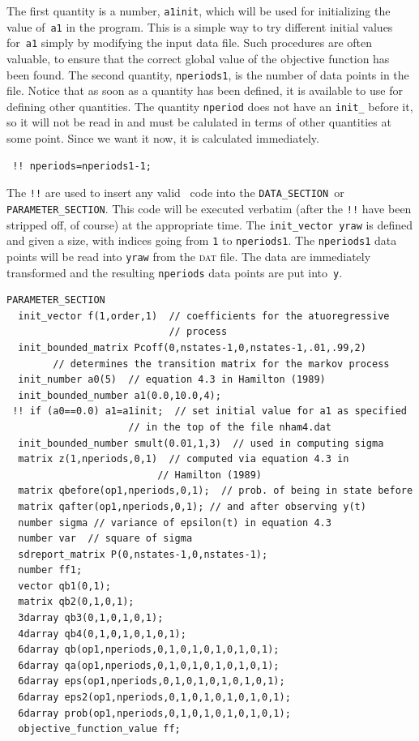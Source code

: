 \documentclass{admbmanual}
\newcommand\DS{\texttt{DATA\_SECTION}}
\newcommand\PS{\texttt{PARAMETER\_SECTION}}
\begin{document}
The first quantity is a number, \texttt{a1init}, which will be used for initializing the
value of~\texttt{a1} in the program. This is a simple way to try 
different initial values for~\texttt{a1} simply by modifying the input data file.
Such procedures are often valuable, to ensure that the correct global
value of the objective function has been found.
The  second quantity, \texttt{nperiods1}, is the number of data points in the
file. Notice that as soon as a quantity has been defined, it is available to use for
defining other quantities. The quantity \texttt{nperiod} does not have an
\texttt{init\_} before it, so it will not be read in and must be calulated
in terms of other quantities at some point. Since we want it now, it is 
calculated immediately.
\begin{lstlisting}
 !! nperiods=nperiods1-1;
\end{lstlisting}
The \texttt{!!} are used to insert any valid \cplus\ code into the \DS\
or \PS. %
This code will be executed verbatim (after the \texttt{!!} have been stripped off, of
course) at the appropriate time.
The \texttt{init\_vector yraw} is defined and given a size, with indices going from
\texttt{1} to \texttt{nperiods1}. The \texttt{nperiods1} data points will be read into
\texttt{yraw} from the \textsc{dat} file. 
The data are immediately transformed and the resulting
\texttt{nperiods} data points are put into~\texttt{y}.
\begin{lstlisting}
PARAMETER_SECTION
  init_vector f(1,order,1)  // coefficients for the atuoregressive
                            // process
  init_bounded_matrix Pcoff(0,nstates-1,0,nstates-1,.01,.99,2)  
        // determines the transition matrix for the markov process
  init_number a0(5)  // equation 4.3 in Hamilton (1989)
  init_bounded_number a1(0.0,10.0,4);  
 !! if (a0==0.0) a1=a1init;  // set initial value for a1 as specified
                     // in the top of the file nham4.dat
  init_bounded_number smult(0.01,1,3)  // used in computing sigma
  matrix z(1,nperiods,0,1)  // computed via equation 4.3 in 
                          // Hamilton (1989)
  matrix qbefore(op1,nperiods,0,1);  // prob. of being in state before
  matrix qafter(op1,nperiods,0,1); // and after observing y(t)
  number sigma // variance of epsilon(t) in equation 4.3
  number var  // square of sigma
  sdreport_matrix P(0,nstates-1,0,nstates-1);
  number ff1;
  vector qb1(0,1); 
  matrix qb2(0,1,0,1); 
  3darray qb3(0,1,0,1,0,1);
  4darray qb4(0,1,0,1,0,1,0,1);
  6darray qb(op1,nperiods,0,1,0,1,0,1,0,1,0,1); 
  6darray qa(op1,nperiods,0,1,0,1,0,1,0,1,0,1);
  6darray eps(op1,nperiods,0,1,0,1,0,1,0,1,0,1);
  6darray eps2(op1,nperiods,0,1,0,1,0,1,0,1,0,1);
  6darray prob(op1,nperiods,0,1,0,1,0,1,0,1,0,1);
  objective_function_value ff;
\end{lstlisting}
\end{document}
